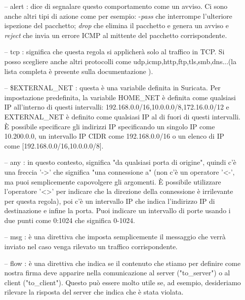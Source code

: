 \documentclass[binding=0.6cm]{sapthesis}
\theoremstyle{definition}
\begin{document}
\begin{itemize}[topsep=10pt, noitemsep]


    \item[--] {alert}  : dice di segnalare questo comportamento come un avviso. Ci sono anche altri tipi di azione come per esempio: -\textit{pass} che interrompe l'ulteriore ispezione del pacchetto;
    \textit{drop} che elimina il pacchetto e genera un avviso e
    \textit{reject} che invia un errore ICMP  al mittente del pacchetto corrispondente.

    \item[--] tcp : significa che questa regola si applicherà solo al traffico in TCP. Si posso scegliere anche altri protocolli come udp,icmp,http,ftp,tls,smb,dns...(la lista completa è presente sulla documentazione \cite{documentazione Suricata}).

    \item[--] \$EXTERNAL\_NET : questa è una variabile definita in Suricata. Per impostazione predefinita, la variabile HOME\_NET è definita come qualsiasi IP all'interno di questi intervalli: 192.168.0.0/16,10.0.0.0/8,172.16.0.0/12 e EXTERNAL\_NET è definito come qualsiasi IP al di fuori di questi intervalli. È possibile specificare gli indirizzi IP specificando un singolo IP come 10.200.0.0, un intervallo IP CIDR come 192.168.0.0/16 o un elenco di IP come [192.168.0.0/16,10.0.0.0/8].

    \item[--] any : in questo contesto, significa "da qualsiasi porta di origine", quindi c'è una freccia '->' che significa "una connessione a" (non c'è un operatore '<-', ma puoi semplicemente capovolgere gli argomenti. È possibile utilizzare l'operatore '<>' per indicare che la direzione della connessione è irrilevante per questa regola), poi c'è un intervallo IP che indica l'indirizzo IP di destinazione e infine la porta. Puoi indicare un intervallo di porte usando i due punti come 0:1024 che significa 0-1024.
    
    \item[--] msg : è una direttiva che imposta semplicemente il messaggio che verrà inviato nel caso venga rilevato un traffico corrispondente.

    \item[--] flow : è una direttiva che indica se il contenuto che stiamo per definire come nostra firma deve apparire nella comunicazione al server ("to\_server") o al client ("to\_client"). Questo può essere molto utile se, ad esempio, desideriamo rilevare la risposta del server che indica che è stata violata.


\end{itemize}
\end{document}
